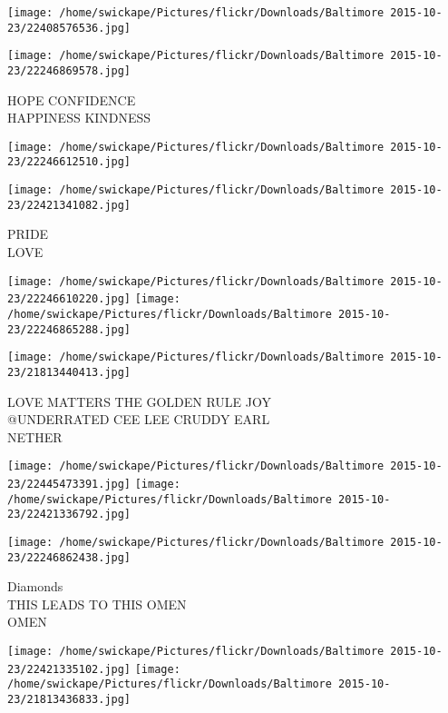 \documentclass[10pt,letterpaper]{article}
\begin{document}
\texttt{[image: /home/swickape/Pictures/flickr/Downloads/Baltimore 2015-10-23/22408576536.jpg]}

\vspace{0.25in}
\texttt{[image: /home/swickape/Pictures/flickr/Downloads/Baltimore 2015-10-23/22246869578.jpg]}

HOPE CONFIDENCE\\
HAPPINESS KINDNESS\\
\pagebreak

\texttt{[image: /home/swickape/Pictures/flickr/Downloads/Baltimore 2015-10-23/22246612510.jpg]}

\vspace{0.25in}
\texttt{[image: /home/swickape/Pictures/flickr/Downloads/Baltimore 2015-10-23/22421341082.jpg]}

PRIDE\\
LOVE\\
\pagebreak

\texttt{[image: /home/swickape/Pictures/flickr/Downloads/Baltimore 2015-10-23/22246610220.jpg]}
\texttt{[image: /home/swickape/Pictures/flickr/Downloads/Baltimore 2015-10-23/22246865288.jpg]}

\vspace{0.25in}
\texttt{[image: /home/swickape/Pictures/flickr/Downloads/Baltimore 2015-10-23/21813440413.jpg]}

LOVE MATTERS THE GOLDEN RULE JOY\\
@UNDERRATED CEE LEE CRUDDY EARL\\
NETHER\\
\pagebreak

\texttt{[image: /home/swickape/Pictures/flickr/Downloads/Baltimore 2015-10-23/22445473391.jpg]}
\texttt{[image: /home/swickape/Pictures/flickr/Downloads/Baltimore 2015-10-23/22421336792.jpg]}

\vspace{0.25in}
\texttt{[image: /home/swickape/Pictures/flickr/Downloads/Baltimore 2015-10-23/22246862438.jpg]}

Diamonds\\
THIS LEADS TO THIS OMEN\\
OMEN\\
\pagebreak

\texttt{[image: /home/swickape/Pictures/flickr/Downloads/Baltimore 2015-10-23/22421335102.jpg]}
\texttt{[image: /home/swickape/Pictures/flickr/Downloads/Baltimore 2015-10-23/21813436833.jpg]}
\end{document}
